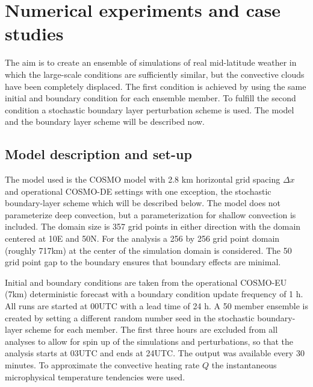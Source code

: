 \documentclass[a4paper, 12pt]{article}
\begin{document}
\section{Numerical experiments and case studies}
The aim is to create an ensemble of simulations of real mid-latitude weather in which the large-scale conditions are sufficiently similar, but the convective clouds have been completely displaced. The first condition is achieved by using the same initial and boundary condition for each ensemble member. To fulfill the second condition a stochastic boundary layer perturbation scheme is used. The model and the boundary layer scheme will be described now. 

\subsection{Model description and set-up}
The model used is the COSMO model \citep{???} with 2.8 km horizontal grid spacing $\Delta x$ and operational COSMO-DE settings \citep{???} with one exception, the stochastic boundary-layer scheme which will be described below. The model does not parameterize deep convection, but a parameterization for shallow convection is included. The domain size is 357 grid points in either direction with the domain centered at 10E and 50N. For the analysis a 256 by 256 grid point domain (roughly 717km) at the center of the simulation domain is considered. The 50 grid point gap to the boundary ensures that boundary effects are minimal. 

Initial and boundary conditions are taken from the operational COSMO-EU (7km) deterministic forecast \citep{???} with a boundary condition update frequency of 1 h. All runs are started at 00UTC with a lead time of 24 h. A 50 member ensemble is created by setting a different random number seed in the stochastic boundary-layer scheme for each member. The first three hours are excluded from all analyses to allow for spin up of the simulations and perturbations, so that the analysis starts at 03UTC and ends at 24UTC. The output was available every 30 minutes. To approximate the convective heating rate $Q$ the instantaneous microphysical temperature tendencies were used.
\end{document}
